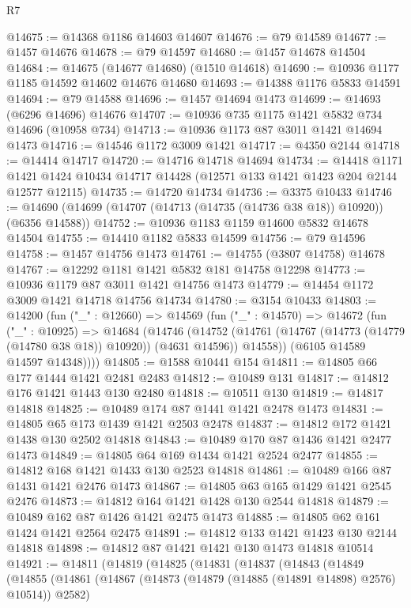 \begin{lexlean}{R7}
\begin{coremodule}
@14675 := @14368 @1186 @14603 @14607
@14676 := @79 @14589
@14677 := @1457 @14676
@14678 := @79 @14597
@14680 := @1457 @14678 @14504
@14684 := @14675 (@14677 @14680) (@1510 @14618)
@14690 := @10936 @1177 @1185 @14592 @14602 @14676 @14680
@14693 := @14388 @1176 @5833 @14591
@14694 := @79 @14588
@14696 := @1457 @14694 @1473
@14699 := @14693 (@6296 @14696) @14676
@14707 := @10936 @735 @1175 @1421 @5832 @734 @14696 (@10958 @734)
@14713 := @10936 @1173 @87 @3011 @1421 @14694 @1473
@14716 := @14546 @1172 @3009 @1421
@14717 := @4350 @2144
@14718 := @14414 @14717
@14720 := @14716 @14718 @14694
@14734 := @14418
    @1171
    @1421
    @1424
    @10434
    @14717
    @14428
    (@12571 @133 @1421 @1423 @204 @2144 @12577 @12115)
@14735 := @14720 @14734
@14736 := @3375 @10433
@14746 := @14690 (@14699 (@14707 (@14713 (@14735 (@14736 @38 @18)) @10920)) (@6356 @14588))
@14752 := @10936 @1183 @1159 @14600 @5832 @14678 @14504
@14755 := @14410 @1182 @5833 @14599
@14756 := @79 @14596
@14758 := @1457 @14756 @1473
@14761 := @14755 (@3807 @14758) @14678
@14767 := @12292 @1181 @1421 @5832 @181 @14758 @12298
@14773 := @10936 @1179 @87 @3011 @1421 @14756 @1473
@14779 := @14454 @1172 @3009 @1421 @14718 @14756 @14734
@14780 := @3154 @10433
@14803 := @14200
    (fun ("_" : @12660) =>
    @14569
      (fun ("_" : @14570) =>
      @14672
        (fun ("_" : @10925) =>
        @14684
          (@14746
            (@14752
              (@14761 (@14767 (@14773 (@14779 (@14780 @38 @18)) @10920)) (@4631 @14596))
              @14558))
          (@6105 @14589 @14597 @14348))))
@14805 := @1588 @10441 @154
@14811 := @14805 @66 @177 @1444 @1421 @2481 @2483
@14812 := @10489 @131
@14817 := @14812 @176 @1421 @1443 @130 @2480
@14818 := @10511 @130
@14819 := @14817 @14818
@14825 := @10489 @174 @87 @1441 @1421 @2478 @1473
@14831 := @14805 @65 @173 @1439 @1421 @2503 @2478
@14837 := @14812 @172 @1421 @1438 @130 @2502 @14818
@14843 := @10489 @170 @87 @1436 @1421 @2477 @1473
@14849 := @14805 @64 @169 @1434 @1421 @2524 @2477
@14855 := @14812 @168 @1421 @1433 @130 @2523 @14818
@14861 := @10489 @166 @87 @1431 @1421 @2476 @1473
@14867 := @14805 @63 @165 @1429 @1421 @2545 @2476
@14873 := @14812 @164 @1421 @1428 @130 @2544 @14818
@14879 := @10489 @162 @87 @1426 @1421 @2475 @1473
@14885 := @14805 @62 @161 @1424 @1421 @2564 @2475
@14891 := @14812 @133 @1421 @1423 @130 @2144 @14818
@14898 := @14812 @87 @1421 @1421 @130 @1473 @14818 @10514
@14921 := @14811
    (@14819
      (@14825
        (@14831
          (@14837
            (@14843
              (@14849
                (@14855
                  (@14861
                    (@14867 (@14873 (@14879 (@14885 (@14891 @14898) @2576) @10514)) @2582)

\end{coremodule}
\end{lexlean}

